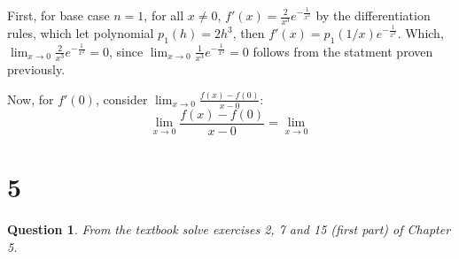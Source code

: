 \documentclass{article}
\newtheorem{question}{Question}
\begin{document}
\hfill

First, for base case $n=1$, for all $x\neq 0$, $f'(x)=\frac{2}{x^3}e^{-\frac{1}{x^2}}$ by the differentiation rules, which let polynomial $p_1(h)=2h^3$, then $f'(x)=p_1(1/x)e^{-\frac{1}{x^2}}$. 
Which, $\lim_{x\rightarrow 0}\frac{2}{x^3}e^{-\frac{1}{x^2}}=0$, since $\lim_{x\rightarrow 0}\frac{1}{x^3}e^{-\frac{1}{x^2}}=0$ follows from the statment proven previously.

Now, for $f'(0)$, consider $\lim_{x\rightarrow 0}\frac{f(x)-f(0)}{x-0}$:
$$\lim_{x\rightarrow 0}\frac{f(x)-f(0)}{x-0}=\lim_{x\rightarrow 0}$$

\break

\section*{5}
\begin{question}
    From the textbook solve exercises 2, 7 and 15 (first part) of Chapter 5.
\end{question}
\end{document}

